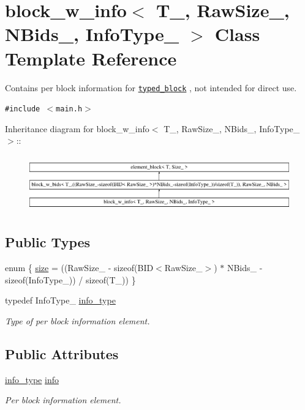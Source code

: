 \hypertarget{classblock__w__info}{
\section{block\_\-w\_\-info$<$ T\_\-, RawSize\_\-, NBids\_\-, InfoType\_\- $>$ Class Template Reference}
\label{classblock__w__info}
}
Contains per block information for {\tt \hyperlink{classtyped__block}{typed\_\-block}} , not intended for direct use.  


{\tt \#include $<$main.h$>$}

Inheritance diagram for block\_\-w\_\-info$<$ T\_\-, RawSize\_\-, NBids\_\-, InfoType\_\- $>$::\begin{figure}[H]
\begin{center}
\leavevmode
\includegraphics[height=2.47423cm]{classblock__w__info}
\end{center}
\end{figure}
\subsection*{Public Types}
\begin{CompactItemize}
\item 
enum \{ \hyperlink{group__mnglayer_gg64e9c147e936f85096c89f816d71695c79551ce6ebb37de68c336bcae6d9c201}{size} =  ((RawSize\_\- - sizeof(BID$<$RawSize\_\-$>$) $\ast$ NBids\_\- - sizeof(InfoType\_\-)) / sizeof(T\_\-))
 \}
\item 
\hypertarget{classblock__w__info_c3678c48b0e137d29be1c0b1fb40d120}{
typedef InfoType\_\- \hyperlink{classblock__w__info_c3678c48b0e137d29be1c0b1fb40d120}{info\_\-type}}
\label{classblock__w__info_c3678c48b0e137d29be1c0b1fb40d120}

\begin{CompactList}\small\item\em Type of per block information element. \item\end{CompactList}\end{CompactItemize}
\subsection*{Public Attributes}
\begin{CompactItemize}
\item 
\hypertarget{group__mnglayer_gbd86ea875a9e866a9c9d7c9d66dc16d0}{
\hyperlink{classblock__w__info_c3678c48b0e137d29be1c0b1fb40d120}{info\_\-type} \hyperlink{group__mnglayer_gbd86ea875a9e866a9c9d7c9d66dc16d0}{info}}
\label{group__mnglayer_gbd86ea875a9e866a9c9d7c9d66dc16d0}

\begin{CompactList}\small\item\em Per block information element. \item\end{CompactList}\end{CompactItemize}


